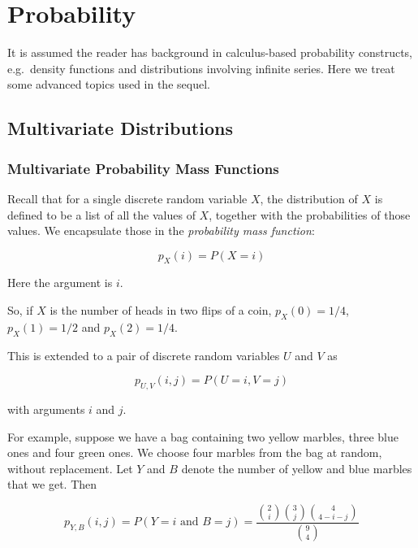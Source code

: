 \chapter{Probability}

It is assumed the reader has background in calculus-based probability
constructs, e.g.\ density functions and distributions involving
infinite series.  Here we treat some advanced topics used in the sequel.

\section{Multivariate Distributions}

\subsection{Multivariate Probability Mass Functions}
\label{marblepmf} 

Recall that for a single discrete random variable $X$, the distribution of
$X$ is defined to be a list of all the values of $X$, together with the
probabilities of those values.  We encapsulate those in the
\textit{probability mass function}:

\begin{equation}
p_X(i) = P(X = i)
\end{equation}

Here the argument is $i$.

So, if $X$ is the number of heads in two flips of a coin, $p_X(0) =
1/4$, $p_X(1) = 1/2$ and $p_X(2) = 1/4$. 

This is extended to a pair of discrete random variables $U$ and $V$ as

\begin{equation}
p_{U,V}(i,j) = P(U = i, V = j)
\end{equation}

with arguments $i$ and $j$.

For example, suppose we have a bag containing two yellow marbles, three
blue ones and four green ones.  We choose four marbles from the bag at
random, without replacement.  Let $Y$ and $B$ denote the number of yellow
and blue marbles that we get.  Then

\begin{equation}
\label{marblepmf}
p_{Y,B}(i,j) = P(Y = i \textrm{ and } B = j) = 
\frac
{
\binom{2}{i}
\binom{3}{j}
\binom{4}{4-i-j}
}
{\binom{9}{4}}
\end{equation}

